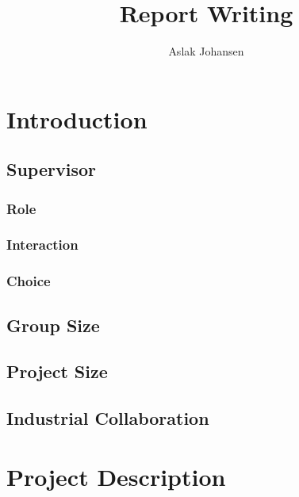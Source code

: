 \documentclass[a4paper]{memoir}
\title{Report Writing \\ \scalebox{0.85}{for Software BSc and MSc Projects}}
\author{Aslak Johansen}
\begin{document}
\maketitle
\tableofcontents

\chapter{Introduction}

\section{Supervisor}

\subsection{Role}

\subsection{Interaction}

\subsection{Choice}

\section{Group Size}

\section{Project Size}

\section{Industrial Collaboration}

\chapter{Project Description}

\end{document}
